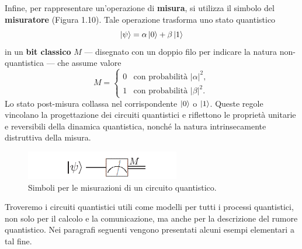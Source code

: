 \documentclass[a4paper,12pt]{report}
\theoremstyle{plain}
\begin{document}
Infine, per rappresentare un'operazione di \textbf{misura}, si utilizza il simbolo del \textbf{misuratore} (Figura 1.10). Tale operazione trasforma uno stato quantistico
\begin{equation}
    \ket{\psi} = \alpha\ket{0} + \beta\ket{1}
\end{equation}
in un \textbf{bit classico} $M$ — disegnato con un doppio filo per indicare la natura non-quantistica — che assume valore
\begin{equation}
    M = \begin{cases}
        0 & \text{con probabilità } |\alpha|^2, \\
        1 & \text{con probabilità } |\beta|^2.
    \end{cases}
\end{equation}
Lo stato post-misura collassa nel corrispondente $\ket{0}$ o $\ket{1}$.
Queste regole vincolano la progettazione dei circuiti quantistici e riflettono le proprietà unitarie e reversibili della dinamica quantistica, nonché la natura intrinsecamente distruttiva della misura.
\begin{figure}[H]
    \centering
    \includegraphics[width=0.6\textwidth]{Immagine10.png} 
    \caption{Simboli per le misurazioni di un circuito quantistico.}
    \label{Immagine10}
\end{figure}
\noindent Troveremo i circuiti quantistici utili come modelli per tutti i processi quantistici, non solo per il calcolo e la comunicazione, ma anche per la descrizione del rumore quantistico. Nei paragrafi seguenti vengono presentati alcuni esempi elementari a tal fine.
\end{document}
